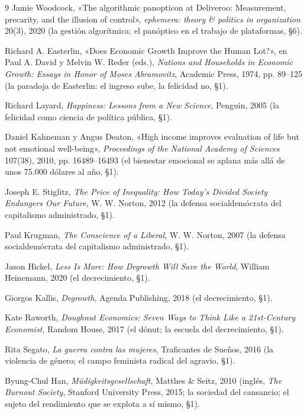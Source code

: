 \documentclass[11pt]{article}
\begin{document}
\begin{thebibliography}{9}
 Jamie Woodcock, «The algorithmic panopticon at
Deliveroo: Measurement, precarity, and the illusion of control»,
\textit{ephemera: theory \& politics in organization} 20(3), 2020 (la
gestión algorítmica; el panóptico en el trabajo de plataformas, §6).

 Richard A. Easterlin, «Does Economic Growth
Improve the Human Lot?», en Paul A. David y Melvin W. Reder (eds.),
\textit{Nations and Households in Economic Growth: Essays in Honor of
Moses Abramovitz}, Academic Press, 1974, pp. 89--125 (la paradoja de
Easterlin: el ingreso sube, la felicidad no, §1).

 Richard Layard, \textit{Happiness: Lessons from a
New Science}, Penguin, 2005 (la felicidad como ciencia de política
pública, §1).

 Daniel Kahneman y Angus Deaton, «High
income improves evaluation of life but not emotional well-being»,
\textit{Proceedings of the National Academy of Sciences} 107(38),
2010, pp. 16489--16493 (el bienestar emocional se aplana más allá de
unos 75.000 dólares al año, §1).

 Joseph E. Stiglitz, \textit{The Price of
Inequality: How Today's Divided Society Endangers Our Future}, W. W.
Norton, 2012 (la defensa socialdemócrata del capitalismo administrado,
§1).

 Paul Krugman, \textit{The Conscience of a
Liberal}, W. W. Norton, 2007 (la defensa socialdemócrata del
capitalismo administrado, §1).

 Jason Hickel, \textit{Less Is More: How Degrowth
Will Save the World}, William Heinemann, 2020 (el decrecimiento, §1).

 Giorgos Kallis, \textit{Degrowth}, Agenda
Publishing, 2018 (el decrecimiento, §1).

 Kate Raworth, \textit{Doughnut Economics: Seven
Ways to Think Like a 21st-Century Economist}, Random House, 2017 (el
dónut; la escuela del decrecimiento, §1).

 Rita Segato, \textit{La guerra contra las
mujeres}, Traficantes de Sueños, 2016 (la violencia de género; el campo
feminista radical del agravio, §1).

 Byung-Chul Han, \textit{Müdigkeitsgesellschaft},
Matthes \& Seitz, 2010 (inglés, \textit{The Burnout Society}, Stanford
University Press, 2015; la sociedad del cansancio; el sujeto del
rendimiento que se explota a sí mismo, §1).


\end{thebibliography}
\end{document}
